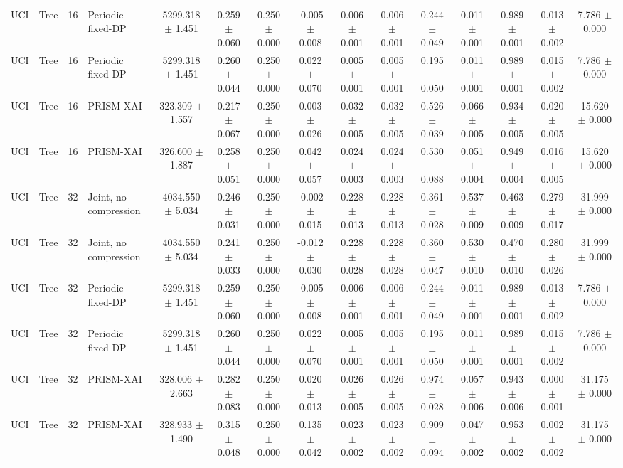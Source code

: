 \begin{tabular}{llllccccccccccc}
UCI & Tree & 16 & Periodic fixed-DP & 5299.318 $\pm$ 1.451 & 0.259 $\pm$ 0.060 & 0.250 $\pm$ 0.000 & -0.005 $\pm$ 0.008 & 0.006 $\pm$ 0.001 & 0.006 $\pm$ 0.001 & 0.244 $\pm$ 0.049 & 0.011 $\pm$ 0.001 & 0.989 $\pm$ 0.001 & 0.013 $\pm$ 0.002 & 7.786 $\pm$ 0.000 \\
UCI & Tree & 16 & Periodic fixed-DP & 5299.318 $\pm$ 1.451 & 0.260 $\pm$ 0.044 & 0.250 $\pm$ 0.000 & 0.022 $\pm$ 0.070 & 0.005 $\pm$ 0.001 & 0.005 $\pm$ 0.001 & 0.195 $\pm$ 0.050 & 0.011 $\pm$ 0.001 & 0.989 $\pm$ 0.001 & 0.015 $\pm$ 0.002 & 7.786 $\pm$ 0.000 \\
UCI & Tree & 16 & PRISM-XAI & 323.309 $\pm$ 1.557 & 0.217 $\pm$ 0.067 & 0.250 $\pm$ 0.000 & 0.003 $\pm$ 0.026 & 0.032 $\pm$ 0.005 & 0.032 $\pm$ 0.005 & 0.526 $\pm$ 0.039 & 0.066 $\pm$ 0.005 & 0.934 $\pm$ 0.005 & 0.020 $\pm$ 0.005 & 15.620 $\pm$ 0.000 \\
UCI & Tree & 16 & PRISM-XAI & 326.600 $\pm$ 1.887 & 0.258 $\pm$ 0.051 & 0.250 $\pm$ 0.000 & 0.042 $\pm$ 0.057 & 0.024 $\pm$ 0.003 & 0.024 $\pm$ 0.003 & 0.530 $\pm$ 0.088 & 0.051 $\pm$ 0.004 & 0.949 $\pm$ 0.004 & 0.016 $\pm$ 0.005 & 15.620 $\pm$ 0.000 \\
UCI & Tree & 32 & Joint, no compression & 4034.550 $\pm$ 5.034 & 0.246 $\pm$ 0.031 & 0.250 $\pm$ 0.000 & -0.002 $\pm$ 0.015 & 0.228 $\pm$ 0.013 & 0.228 $\pm$ 0.013 & 0.361 $\pm$ 0.028 & 0.537 $\pm$ 0.009 & 0.463 $\pm$ 0.009 & 0.279 $\pm$ 0.017 & 31.999 $\pm$ 0.000 \\
UCI & Tree & 32 & Joint, no compression & 4034.550 $\pm$ 5.034 & 0.241 $\pm$ 0.033 & 0.250 $\pm$ 0.000 & -0.012 $\pm$ 0.030 & 0.228 $\pm$ 0.028 & 0.228 $\pm$ 0.028 & 0.360 $\pm$ 0.047 & 0.530 $\pm$ 0.010 & 0.470 $\pm$ 0.010 & 0.280 $\pm$ 0.026 & 31.999 $\pm$ 0.000 \\
UCI & Tree & 32 & Periodic fixed-DP & 5299.318 $\pm$ 1.451 & 0.259 $\pm$ 0.060 & 0.250 $\pm$ 0.000 & -0.005 $\pm$ 0.008 & 0.006 $\pm$ 0.001 & 0.006 $\pm$ 0.001 & 0.244 $\pm$ 0.049 & 0.011 $\pm$ 0.001 & 0.989 $\pm$ 0.001 & 0.013 $\pm$ 0.002 & 7.786 $\pm$ 0.000 \\
UCI & Tree & 32 & Periodic fixed-DP & 5299.318 $\pm$ 1.451 & 0.260 $\pm$ 0.044 & 0.250 $\pm$ 0.000 & 0.022 $\pm$ 0.070 & 0.005 $\pm$ 0.001 & 0.005 $\pm$ 0.001 & 0.195 $\pm$ 0.050 & 0.011 $\pm$ 0.001 & 0.989 $\pm$ 0.001 & 0.015 $\pm$ 0.002 & 7.786 $\pm$ 0.000 \\
UCI & Tree & 32 & PRISM-XAI & 328.006 $\pm$ 2.663 & 0.282 $\pm$ 0.083 & 0.250 $\pm$ 0.000 & 0.020 $\pm$ 0.013 & 0.026 $\pm$ 0.005 & 0.026 $\pm$ 0.005 & 0.974 $\pm$ 0.028 & 0.057 $\pm$ 0.006 & 0.943 $\pm$ 0.006 & 0.000 $\pm$ 0.001 & 31.175 $\pm$ 0.000 \\
UCI & Tree & 32 & PRISM-XAI & 328.933 $\pm$ 1.490 & 0.315 $\pm$ 0.048 & 0.250 $\pm$ 0.000 & 0.135 $\pm$ 0.042 & 0.023 $\pm$ 0.002 & 0.023 $\pm$ 0.002 & 0.909 $\pm$ 0.094 & 0.047 $\pm$ 0.002 & 0.953 $\pm$ 0.002 & 0.002 $\pm$ 0.002 & 31.175 $\pm$ 0.000 \\
\bottomrule
\end{tabular}
